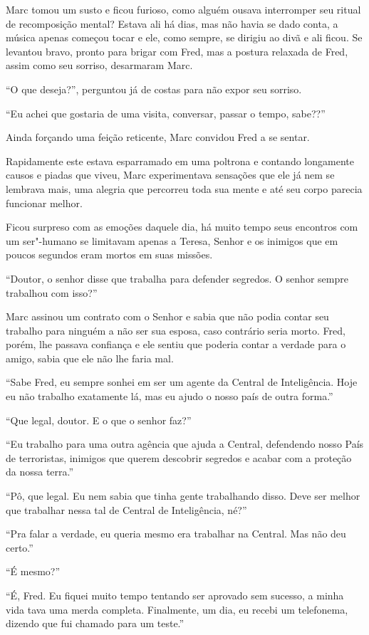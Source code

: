 Marc tomou um susto e ficou furioso, como alguém ousava interromper seu
ritual de recomposição mental? Estava ali há dias, mas não havia se dado
conta, a música apenas começou tocar e ele, como sempre, se dirigiu ao
divã e ali ficou. Se levantou bravo, pronto para brigar com Fred, mas a
postura relaxada de Fred, assim como seu sorriso, desarmaram Marc.

``O que deseja?'', perguntou já de costas para não expor seu sorriso.

``Eu achei que gostaria de uma visita, conversar, passar o tempo,
sabe??''

Ainda forçando uma feição reticente, Marc convidou Fred a se sentar.

Rapidamente este estava esparramado em uma poltrona e contando
longamente causos e piadas que viveu, Marc experimentava sensações que
ele já nem se lembrava mais, uma alegria que percorreu toda sua mente e
até seu corpo parecia funcionar melhor.

Ficou surpreso com as emoções daquele dia, há muito tempo seus encontros
com um ser"-humano se limitavam apenas a Teresa, Senhor  e os inimigos
que em poucos segundos eram mortos em suas missões.

``Doutor, o senhor disse que trabalha para defender segredos. O senhor
sempre trabalhou com isso?''

Marc assinou um contrato com o Senhor  e sabia que não podia contar seu
trabalho para ninguém a não ser sua esposa, caso contrário seria morto.
Fred, porém, lhe passava confiança e ele sentiu que poderia contar a
verdade para o amigo, sabia que ele não lhe faria mal.

``Sabe Fred, eu sempre sonhei em ser um agente da Central de
Inteligência. Hoje eu não trabalho exatamente lá, mas eu ajudo o nosso
país de outra forma.''

``Que legal, doutor. E o que o senhor faz?''

``Eu trabalho para uma outra agência que ajuda a Central, defendendo
nosso País de terroristas, inimigos que querem descobrir segredos e
acabar com a proteção da nossa terra.''

``Pô, que legal. Eu nem sabia que tinha gente trabalhando disso. Deve
ser melhor que trabalhar nessa tal de Central de Inteligência, né?''

``Pra falar a verdade, eu queria mesmo era trabalhar na Central. Mas não
deu certo.''

``É mesmo?''

``É, Fred. Eu fiquei muito tempo tentando ser aprovado sem sucesso, a
minha vida tava uma merda completa. Finalmente, um dia, eu recebi um
telefonema, dizendo que fui chamado para um teste.''

